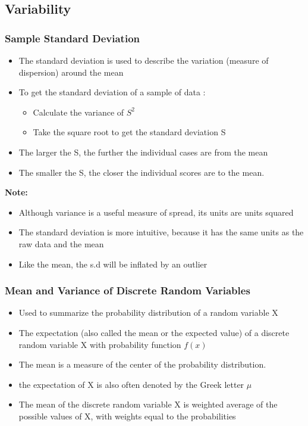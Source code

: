 \documentclass{article}
\begin{document}
\subsection{Variability}
 
\subsubsection{Sample Standard Deviation}
\begin{itemize}
\item The standard deviation is used to describe the variation (measure of dispersion) around the mean 
\item To get the standard deviation of a sample of data : 
\begin{itemize}
\item Calculate the variance of \(S^2\)
\item Take the square root to get the standard deviation S
\end{itemize}
\item The larger the S, the further the individual cases are from the mean 
\item The smaller the S, the closer the individual scores are to the mean.
\end{itemize}

\textbf{Note:}
\begin{itemize}
\item Although variance is a useful measure of spread, its units are units squared 
\item The standard deviation is more intuitive, because it has the same units as the raw data and the mean 
\item Like the mean, the s.d will be inflated by an outlier 
\end{itemize}

\subsubsection{Mean and Variance of Discrete Random Variables}
\begin{itemize}
\item Used to summarize the probability distribution of a random variable X
\item The expectation (also called the mean or the expected value) of a discrete random variable X with probability function \(f(x)\)
\item The mean is a measure of the center of the probability distribution. 
\item the expectation of X is also often denoted by the Greek letter \(\mu\) 
\item The mean of the discrete random variable X is weighted average of the possible values of X, with weights equal to the probabilities 
\end{itemize}
\end{document}
